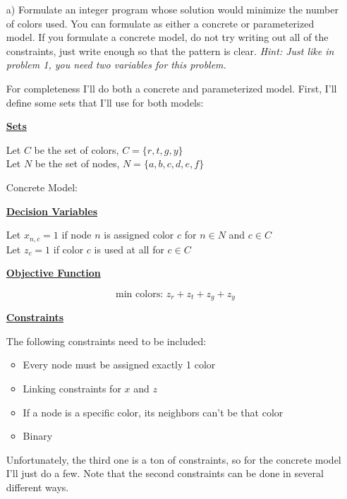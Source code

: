 \documentclass[11pt]{article}
\theoremstyle{definition}
\newcommand{\blu}{\color{blue}}
\begin{document}
\begin{enumerate}
\item [a)] Formulate an integer program whose solution would minimize the number of colors used. You can formulate as either a concrete or parameterized model. If you formulate a concrete model, do not try writing out all of the constraints, just write enough so that the pattern is clear. \emph{Hint: Just like in problem 1, you need two variables for this problem.}

{\blu

For completeness I'll do both a concrete and parameterized model. First, I'll define some sets that I'll use for both models:

\textbf{\underline{Sets}}

Let $C$ be the set of colors, $C = \{r, t, g, y\}$\\
Let $N$ be the set of nodes, $N = \{a,b,c,d,e,f\}$


Concrete Model:

\textbf{\underline{Decision Variables}}

Let $x_{n,c} = 1$ if node $n$ is assigned color $c$ for $n \in N$ and $c \in C$ \\
Let $z_c = 1$ if color $c$ is used at all for $c \in C$

\textbf{\underline{Objective Function}}

\[
\text{min colors: } z_r + z_t + z_g + z_y
\]

\textbf{\underline{Constraints}}

The following constraints need to be included:
\begin{itemize}
\item Every node must be assigned exactly 1 color
\item Linking constraints for $x$ and $z$ 
\item If a node is a specific color, its neighbors can't be that color
\item Binary
\end{itemize}

Unfortunately, the third one is a ton of constraints, so for the concrete model I'll just do a few. Note that the second constraints can be done in several different ways.

}
\end{enumerate}
\end{document}
